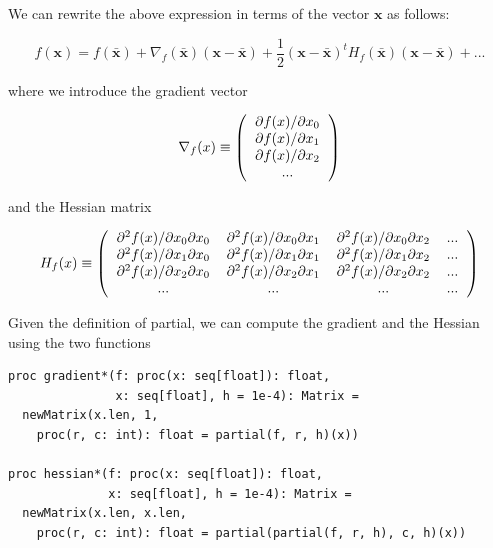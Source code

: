 \documentclass[justified, sixbynine]{tufte-book}
\def\ft{\small\tt}
\theoremstyle{plain}%
\newtheorem * {corollary}{Corollary}
\theoremstyle{definition}
\theoremstyle{remark}
\newtheorem * {remark}{Remark}
\newtheorem * {note}{Note}
\begin{document}
\begin{fullwidth}
We can rewrite the above expression in terms of the vector $\mathbf{x}$ as follows:

\begin{equation}
f(\mathbf{x}) = f(\mathbf{\bar x}) + \nabla_f(\mathbf{\bar x})(\mathbf{x}-\mathbf{\bar x})
+ \frac12 (\mathbf{x}-\mathbf{\bar x})^t H_f(\mathbf{\bar x})(\mathbf{x}-\mathbf{\bar x}) + ...
\end{equation}

where we introduce the gradient vector

\begin{equation}
\nabla_f(x) \equiv \left(
\begin{tabular}{c}
$\partial f(x)/\partial x_0$ \\
$\partial f(x)/\partial x_1$ \\
$\partial f(x)/\partial x_2$ \\
...
\end{tabular}
\right)
\end{equation}

and the Hessian matrix

\begin{equation}
H_f(x) \equiv \left(
\begin{tabular}{cccc}
$\partial^2 f(x)/\partial x_0\partial x_0$ &
$\partial^2 f(x)/\partial x_0\partial x_1$ &
$\partial^2 f(x)/\partial x_0\partial x_2$ &
... \\
$\partial^2 f(x)/\partial x_1\partial x_0$ &
$\partial^2 f(x)/\partial x_1\partial x_1$ &
$\partial^2 f(x)/\partial x_1\partial x_2$ &
... \\
$\partial^2 f(x)/\partial x_2\partial x_0$ &
$\partial^2 f(x)/\partial x_2\partial x_1$ &
$\partial^2 f(x)/\partial x_2\partial x_2$ &
... \\
... & ... & ... & ...
\end{tabular}
\right)
\end{equation}

Given the definition of partial, we can compute the gradient and the Hessian using the two functions

\begin{lstlisting}[caption={in file: {\ft nlib.nim}}]
proc gradient*(f: proc(x: seq[float]): float,
               x: seq[float], h = 1e-4): Matrix =
  newMatrix(x.len, 1,
    proc(r, c: int): float = partial(f, r, h)(x))

proc hessian*(f: proc(x: seq[float]): float,
              x: seq[float], h = 1e-4): Matrix =
  newMatrix(x.len, x.len,
    proc(r, c: int): float = partial(partial(f, r, h), c, h)(x))
\end{lstlisting}


\end{fullwidth}
\end{document}
